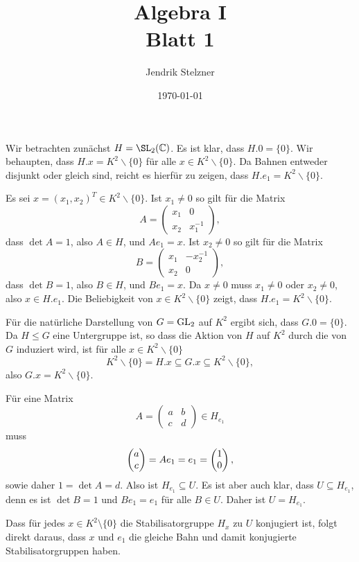 \documentclass[a4paper,10pt]{article}
\title{\sc Algebra I \\ \Large Blatt 1}
\author{Jendrik Stelzner}
\date{\today}
\begin{document}
\maketitle





\section{}
Wir betrachten zunächst $H = \SL_2(\C)$. Es ist klar, dass $H.0 = \{0\}$. Wir behaupten, dass $H.x = K^2 \smallsetminus \{0\}$ für alle $x \in K^2 \smallsetminus \{0\}$. Da Bahnen entweder disjunkt oder gleich sind, reicht es hierfür zu zeigen, dass $H.e_1 = K^2 \smallsetminus \{0\}$.

Es sei $x = (x_1,x_2)^T \in K^2 \smallsetminus \{0\}$. Ist $x_1 \neq 0$ so gilt für die Matrix
\[
 A =
 \begin{pmatrix}
  x_1 & 0 \\
  x_2 & x_1^{-1}
 \end{pmatrix},
\]
dass $\det A = 1$, also $A \in H$, und $Ae_1 = x$. Ist $x_2 \neq 0$ so gilt für die Matrix
\[
 B =
 \begin{pmatrix}
  x_1 & -x_2^{-1} \\
  x_2 & 0
 \end{pmatrix},
\]
dass $\det B = 1$, also $B \in H$, und $B e_1 = x$. Da $x \neq 0$ muss $x_1 \neq 0$ oder $x_2 \neq 0$, also $x \in H.e_1$. Die Beliebigkeit von $x \in K^2 \smallsetminus \{0\}$ zeigt, dass $H.e_1 = K^2 \smallsetminus \{0\}$.

Für die natürliche Darstellung von $G = \operatorname{GL}_2$ auf $K^2$ ergibt sich, dass $G.0 = \{0\}$. Da $H \leq G$ eine Untergruppe ist, so dass die Aktion von $H$ auf $K^2$ durch die von $G$ induziert wird, ist für alle $x \in K^2 \smallsetminus\{0\}$
\[
 K^2 \smallsetminus \{0\} = H.x \subseteq G.x \subseteq K^2 \smallsetminus\{0\},
\]
also $G.x = K^2 \smallsetminus\{0\}$.

Für eine Matrix
\[
 A =
 \begin{pmatrix}
  a & b \\
  c & d
 \end{pmatrix}
 \in
 H_{e_1}
\]
muss
\[
 \begin{pmatrix}a\\c\end{pmatrix} = Ae_1 = e_1 = \begin{pmatrix}1\\0\end{pmatrix},
\]
sowie daher $1 = \det A = d$. Also ist $H_{e_1} \subseteq U$. Es ist aber auch klar, dass $U \subseteq H_{e_1}$, denn es ist $\det B = 1$ und $Be_1 = e_1$ für alle $B \in U$. Daher ist $U = H_{e_1}$.

Dass für jedes $x \in K^2 \setminus \{0\}$ die Stabilisatorgruppe $H_x$ zu $U$ konjugiert ist, folgt direkt daraus, dass $x$ und $e_1$ die gleiche Bahn und damit konjugierte Stabilisatorgruppen haben.
\end{document}
